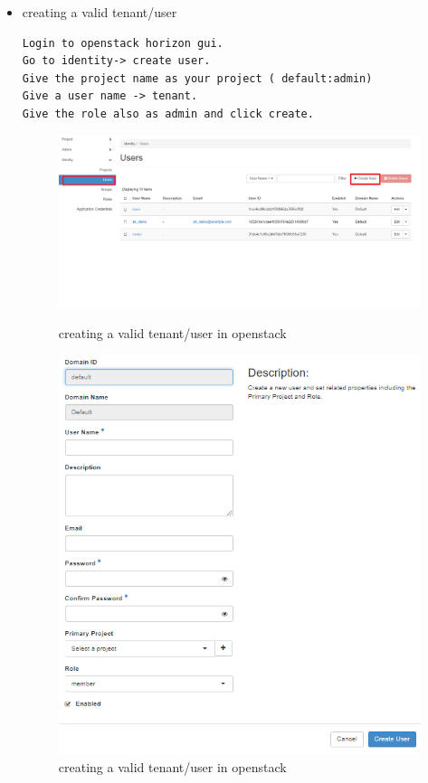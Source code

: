 \begin{itemize}
\item creating a valid tenant/user
\begin{lstlisting}
Login to openstack horizon gui.
Go to identity-> create user.
Give the project name as your project ( default:admin)
Give a user name -> tenant.
Give the role also as admin and click create.
\end{lstlisting}
\begin{figure} [H]
	\centering
	\includegraphics[width=0.5\linewidth]{figures/sh9}
	\caption{creating a valid tenant/user in openstack}
		\includegraphics[width=0.5\linewidth]{figures/sh10}
	\caption{creating a valid tenant/user in openstack}
\end{figure}


\end{itemize}
